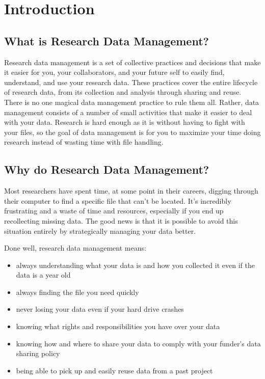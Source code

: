 \documentclass[
]{book}
\providecommand{\tightlist}{%
  \setlength{\itemsep}{0pt}\setlength{\parskip}{0pt}}
\begin{document}
\hypertarget{introduction}{%
\chapter{Introduction}\label{introduction}}

\hypertarget{what-rdm}{%
\section{What is Research Data Management?}\label{what-rdm}}

Research data management is a set of collective practices and decisions that make it easier for you, your collaborators, and your future self to easily find, understand, and use your research data. These practices cover the entire lifecycle of research data, from its collection and analysis through sharing and reuse. There is no one magical data management practice to rule them all. Rather, data management consists of a number of small activities that make it easier to deal with your data. Research is hard enough as it is without having to fight with your files, so the goal of data management is for you to maximize your time doing research instead of wasting time with file handling.

\hypertarget{why-rdm}{%
\section{Why do Research Data Management?}\label{why-rdm}}

Most researchers have spent time, at some point in their careers, digging through their computer to find a specific file that can't be located. It's incredibly frustrating and a waste of time and resources, especially if you end up recollecting missing data. The good news is that it is possible to avoid this situation entirely by strategically managing your data better.

Done well, research data management means:

\begin{itemize}
\tightlist
\item
  always understanding what your data is and how you collected it even if the data is a year old
\item
  always finding the file you need quickly
\item
  never losing your data even if your hard drive crashes
\item
  knowing what rights and responsibilities you have over your data
\item
  knowing how and where to share your data to comply with your funder's data sharing policy
\item
  being able to pick up and easily reuse data from a past project
\end{itemize}
\end{document}

